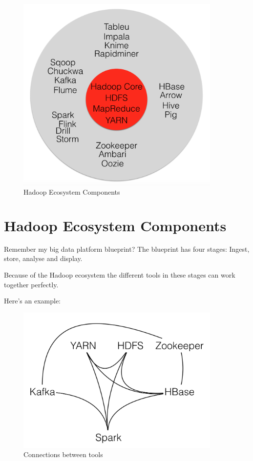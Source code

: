 \documentclass[12pt, numbers=noenddot]{scrreprt} %
\begin{document}
\begin{figure}[htbp]
  \centering
     \includegraphics[width=0.9\textwidth]{images/Hadoop-Ecosystem.png}
  \caption{Hadoop Ecosystem Components}
  \label{fig:Bild1}
\end{figure}

\section{Hadoop Ecosystem Components}
Remember my big data platform blueprint? The blueprint has four stages: Ingest, store, analyse and display.

Because of the Hadoop ecosystem the different tools in these stages can work together perfectly.

Here’s an example:
\begin{figure}[htbp]
  \centering
     \includegraphics[width=0.9\textwidth]{images/Hadoop-Ecosystem-Connections.png}
  \caption{Connections between tools}
  \label{fig:Bild1}
\end{figure}
\end{document}
